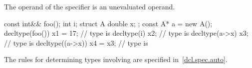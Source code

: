 The operand of the  specifier is an unevaluated
operand.

\begin{example}
\begin{codeblock}
const int&& foo();
int i;
struct A { double x; };
const A* a = new A();
decltype(foo()) x1 = 17;        // type is 
decltype(i) x2;                 // type is 
decltype(a->x) x3;              // type is 
decltype((a->x)) x4 = x3;       // type is 
\end{codeblock}
\end{example}
\begin{note}
The rules for determining types involving  are specified
in~\ref{dcl.spec.auto}.
\end{note}

